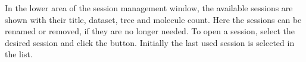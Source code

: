 In the lower area of the session management window, the available sessions are shown with their title, dataset, tree and molecule count. Here the sessions can be renamed or removed, if they are no longer needed. To open a session, select the desired session and click the  button. Initially the last used session is selected in the list.

